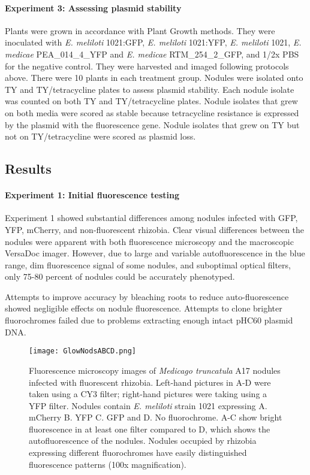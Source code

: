 \documentclass[12pt]{article}
\begin{document}
\begin{doublespace}
	\paragraph{Experiment 3: Assessing plasmid stability}
Plants were grown in accordance with Plant Growth methods. They were inoculated with \textit{E. meliloti} 1021:GFP, \textit{E. meliloti} 1021:YFP, \textit{E. meliloti} 1021, \textit{E. medicae} PEA\_014\_4\_YFP and \textit{E. medicae} RTM\_254\_2\_GFP, and 1/2x PBS for the negative control. They were harvested and imaged following protocols above. There were 10 plants in each treatment group. Nodules were isolated onto TY and TY/tetracycline plates to assess plasmid stability. Each nodule isolate was counted on both TY and TY/tetracycline plates. Nodule isolates that grew on both media were scored as stable because tetracycline resistance is expressed by the plasmid with the fluorescence gene. Nodule isolates that grew on TY but not on TY/tetracycline were scored as plasmid loss. 


\subsection{Results}
	\paragraph{Experiment 1: Initial fluorescence testing}
Experiment 1 showed substantial differences among nodules infected with GFP, YFP, mCherry, and non-fluorescent rhizobia. Clear visual differences between the nodules were apparent with both fluorescence microscopy and the macroscopic VersaDoc imager. However, due to large and variable autofluorescence in the blue range, dim fluorescence signal of some nodules, and suboptimal optical filters, only 75-80 percent of nodules could be accurately phenotyped.

Attempts to improve accuracy by bleaching roots to reduce auto-fluorescence showed negligible effects on nodule fluorescence. Attempts to clone brighter fluorochromes failed due to problems extracting enough intact pHC60 plasmid DNA. 
		\begin{figure}[h!] 
			\centering
			\texttt{[image: GlowNodsABCD.png]}
			\caption{Fluorescence microscopy images of \textit{Medicago  truncatula} A17 nodules infected with fluorescent rhizobia. Left-hand pictures in A-D were taken using a CY3 filter; right-hand pictures were taking using a YFP filter. Nodules contain \textit{E. meliloti} strain 1021 expressing A. mCherry B. YFP C. GFP and D. No fluorochrome. A-C show bright fluorescence in at least one filter compared to D, which shows the autofluorescence of the nodules. Nodules occupied by rhizobia expressing different fluorochromes have easily distinguished fluorescence patterns (100x magnification).}
			\label{fig:microscopy}
		\end{figure}

\end{doublespace}
\end{document}
